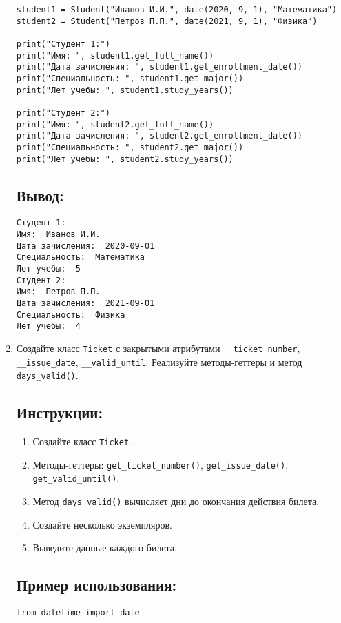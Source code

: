 \begin{enumerate}
\begin{lstlisting}[caption=Пример кода]
student1 = Student("Иванов И.И.", date(2020, 9, 1), "Математика")
student2 = Student("Петров П.П.", date(2021, 9, 1), "Физика")

print("Студент 1:")
print("Имя: ", student1.get_full_name())
print("Дата зачисления: ", student1.get_enrollment_date())
print("Специальность: ", student1.get_major())
print("Лет учебы: ", student1.study_years())

print("Студент 2:")
print("Имя: ", student2.get_full_name())
print("Дата зачисления: ", student2.get_enrollment_date())
print("Специальность: ", student2.get_major())
print("Лет учебы: ", student2.study_years())
\end{lstlisting}

\subsection*{Вывод:}
\begin{lstlisting}[caption=Ожидаемый вывод]
Студент 1:
Имя:  Иванов И.И.
Дата зачисления:  2020-09-01
Специальность:  Математика
Лет учебы:  5
Студент 2:
Имя:  Петров П.П.
Дата зачисления:  2021-09-01
Специальность:  Физика
Лет учебы:  4
\end{lstlisting}

\item
Создайте класс \texttt{Ticket} с закрытыми атрибутами \texttt{\_\_ticket\_number}, \texttt{\_\_issue\_date}, \texttt{\_\_valid\_until}. Реализуйте методы-геттеры и метод \texttt{days\_valid()}.

\subsection*{Инструкции:}
\begin{enumerate}
    \item Создайте класс \texttt{Ticket}.
    \item Методы-геттеры: \texttt{get\_ticket\_number()}, \texttt{get\_issue\_date()}, \texttt{get\_valid\_until()}.
    \item Метод \texttt{days\_valid()} вычисляет дни до окончания действия билета.
    \item Создайте несколько экземпляров.
    \item Выведите данные каждого билета.
\end{enumerate}

\subsection*{Пример использования:}
\begin{lstlisting}[caption=Пример кода]
from datetime import date


\end{lstlisting}
\end{enumerate}
